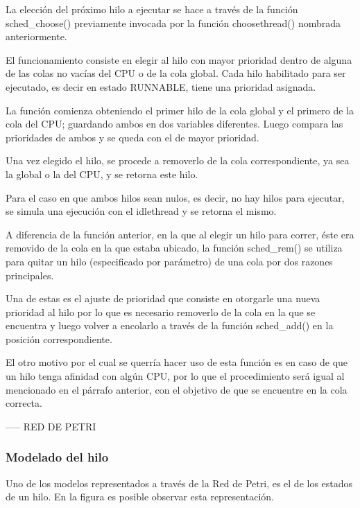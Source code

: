 La elección del próximo hilo a ejecutar se hace a través de la función sched\_choose() previamente invocada por la función choosethread() nombrada anteriormente.

El funcionamiento consiste en elegir al hilo con mayor prioridad dentro de alguna de las colas no vacías del CPU o de la cola global. Cada hilo habilitado para ser ejecutado, es decir en estado RUNNABLE, tiene una prioridad asignada.

La función comienza obteniendo el primer hilo de la cola global y el primero de la cola del CPU; guardando ambos en dos variables diferentes. Luego compara las prioridades de ambos y se queda con el de mayor prioridad.

Una vez elegido el hilo, se procede a removerlo de la cola correspondiente, ya sea la global o la del CPU, y se retorna este hilo.

Para el caso en que ambos hilos sean nulos, es decir, no hay hilos para ejecutar, se simula una ejecución con el idlethread y se retorna el mismo.

A diferencia de la función anterior, en la que al elegir un hilo para correr, éste era removido de la cola en la que estaba ubicado, la función sched\_rem() se utiliza para quitar un hilo (especificado por parámetro) de una cola por dos razones principales.\par

Una de estas es el ajuste de prioridad que consiste en otorgarle una nueva prioridad al hilo por lo que es necesario removerlo de la cola en la que se encuentra y luego volver a encolarlo a través de la función sched\_add() en la posición correspondiente.\par

El otro motivo por el cual se querría hacer uso de esta función es en caso de que un hilo tenga afinidad con algún CPU, por lo que el procedimiento será igual al mencionado en el párrafo anterior, con el objetivo de que se encuentre en la cola correcta.\par


----- RED DE PETRI

\subsubsection{Modelado del hilo}
Uno de los modelos representados a través de la Red de Petri, es el de los estados de un hilo. En la figura es posible observar esta representación.\par

